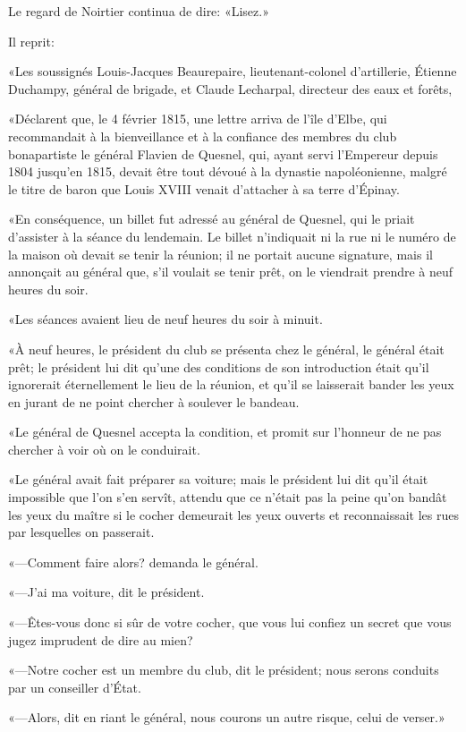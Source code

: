 Le regard de Noirtier continua de dire: «Lisez.» 

Il reprit: 

«Les soussignés Louis-Jacques Beaurepaire, lieutenant-colonel d'artillerie, Étienne Duchampy, général de brigade, et Claude Lecharpal, directeur des eaux et forêts, 

«Déclarent que, le 4 février 1815, une lettre arriva de l'île d'Elbe, qui recommandait à la bienveillance et à la confiance des membres du club bonapartiste le général Flavien de Quesnel, qui, ayant servi l'Empereur depuis 1804 jusqu'en 1815, devait être tout dévoué à la dynastie napoléonienne, malgré le titre de baron que Louis XVIII venait d'attacher à sa terre d'Épinay. 

«En conséquence, un billet fut adressé au général de Quesnel, qui le priait d'assister à la séance du lendemain. Le billet n'indiquait ni la rue ni le numéro de la maison où devait se tenir la réunion; il ne portait aucune signature, mais il annonçait au général que, s'il voulait se tenir prêt, on le viendrait prendre à neuf heures du soir. 

«Les séances avaient lieu de neuf heures du soir à minuit. 

«À neuf heures, le président du club se présenta chez le général, le général était prêt; le président lui dit qu'une des conditions de son introduction était qu'il ignorerait éternellement le lieu de la réunion, et qu'il se laisserait bander les yeux en jurant de ne point chercher à soulever le bandeau. 

«Le général de Quesnel accepta la condition, et promit sur l'honneur de ne pas chercher à voir où on le conduirait. 

«Le général avait fait préparer sa voiture; mais le président lui dit qu'il était impossible que l'on s'en servît, attendu que ce n'était pas la peine qu'on bandât les yeux du maître si le cocher demeurait les yeux ouverts et reconnaissait les rues par lesquelles on passerait. 

«—Comment faire alors? demanda le général. 

«—J'ai ma voiture, dit le président. 

«—Êtes-vous donc si sûr de votre cocher, que vous lui confiez un secret que vous jugez imprudent de dire au mien? 

«—Notre cocher est un membre du club, dit le président; nous serons conduits par un conseiller d'État. 

«—Alors, dit en riant le général, nous courons un autre risque, celui de verser.» 

